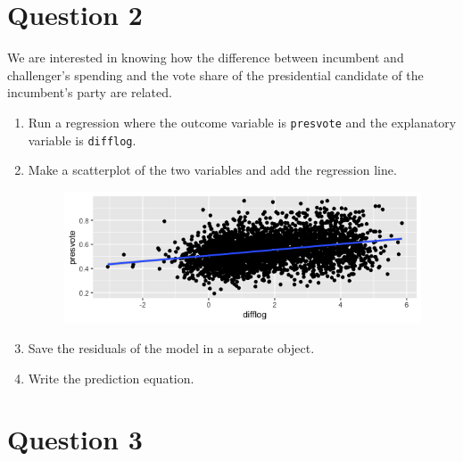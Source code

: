 \documentclass[12pt,letterpaper]{article}
\begin{document}
\section*{Question 2}
\noindent We are interested in knowing how the difference between incumbent and challenger's spending and the vote share of the presidential candidate of the incumbent's party are related.	\vspace{.25cm}
	\begin{enumerate}
		\item Run a regression where the outcome variable is \texttt{presvote} and the explanatory variable is \texttt{difflog}.	\vspace{2cm}
		  		
		\item Make a scatterplot of the two variables and add the regression line. 	\vspace{2cm}
		
		  \begin{figure}[h]
		  	\centering
		  	\includegraphics[width=0.7\linewidth]{splot2}
		  	\caption{}
		  	\label{fig:splot2}
		  \end{figure}
		\item Save the residuals of the model in a separate object.	\vspace{2cm}
		
		\item Write the prediction equation.
		
	\end{enumerate}
	
	\newpage	
\section*{Question 3}
\end{document}
